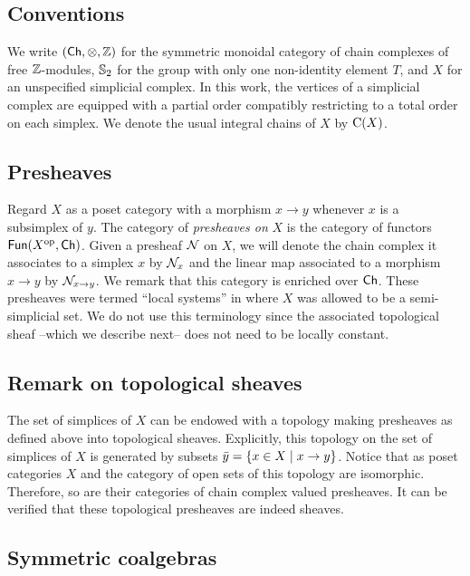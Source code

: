 
\subsection{Conventions}

We write $(\mathsf{Ch}, \otimes, \mathbb{Z})$ for the symmetric monoidal category of chain complexes of free $\mathbb{Z}$-modules, $\mathbb{S}_2$ for the group with only one non-identity element $T$, and $X$ for an unspecified simplicial complex.
In this work, the vertices of a simplicial complex are equipped with a partial order compatibly restricting to a total order on each simplex.
We denote the usual integral chains of $X$ by $\operatorname{C}(X)$.

\subsection{Presheaves}\label{ss:presheaves}

Regard $X$ as a poset category with a morphism $x \to y$ whenever $x$ is a subsimplex of $y$.
The category of \textit{presheaves on} $X$ is the category of functors $\mathsf{Fun}(X^{\mathrm{op}}, \mathsf{Ch})$.
Given a presheaf $\mathcal{N}$ on $X$, we will denote the chain complex it associates to a simplex $x$ by $\mathcal{N}_x$ and the linear map associated to a morphism $x \to y$ by $\mathcal{N}_{x \to y}$.
We remark that this category is enriched over $\mathsf{Ch}$.
These presheaves were termed ``local systems'' in \cite{ranicki1990assembly} where $X$ was allowed to be a semi-simplicial set.
We do not use this terminology since the associated topological sheaf --which we describe next-- does not need to be locally constant.

\subsection{Remark on topological sheaves}\label{ss:topological sheaf}

The set of simplices of $X$ can be endowed with a topology making presheaves as defined above into topological sheaves.
Explicitly, this topology on the set of simplices of $X$ is generated by subsets $\bar y = \{x \in X \mid x \to y\}$.
Notice that as poset categories $X$ and the category of open sets of this topology are isomorphic.
Therefore, so are their categories of chain complex valued presheaves.
It can be verified that these topological presheaves are indeed sheaves.

\subsection{Symmetric coalgebras}

